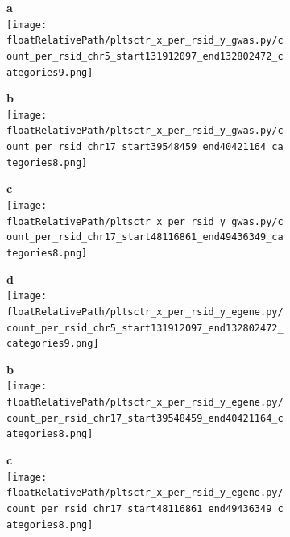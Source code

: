 \begin{figure}[!tbp]

\begin{subfigure}[]{.32\textwidth}
\textbf{a}
\\
\texttt{[image: \\floatRelativePath/pltsctr\_x\_per\_rsid\_y\_gwas.py/count\_per\_rsid\_chr5\_start131912097\_end132802472\_categories9.png]}
\end{subfigure}
%
\begin{subfigure}[]{.32\textwidth}
\textbf{b}
\\
\texttt{[image: \\floatRelativePath/pltsctr\_x\_per\_rsid\_y\_gwas.py/count\_per\_rsid\_chr17\_start39548459\_end40421164\_categories8.png]}
\end{subfigure}
%
\begin{subfigure}[]{.32\textwidth}
\textbf{c}
\\
\texttt{[image: \\floatRelativePath/pltsctr\_x\_per\_rsid\_y\_gwas.py/count\_per\_rsid\_chr17\_start48116861\_end49436349\_categories8.png]}
\end{subfigure}


\begin{subfigure}[]{.32\textwidth}
\textbf{d}
\\
\texttt{[image: \\floatRelativePath/pltsctr\_x\_per\_rsid\_y\_egene.py/count\_per\_rsid\_chr5\_start131912097\_end132802472\_categories9.png]}
\end{subfigure}
%
\begin{subfigure}[]{.32\textwidth}
\textbf{b}
\\
\texttt{[image: \\floatRelativePath/pltsctr\_x\_per\_rsid\_y\_egene.py/count\_per\_rsid\_chr17\_start39548459\_end40421164\_categories8.png]}
\end{subfigure}
%
\begin{subfigure}[]{.32\textwidth}
\textbf{c}
\\
\texttt{[image: \\floatRelativePath/pltsctr\_x\_per\_rsid\_y\_egene.py/count\_per\_rsid\_chr17\_start48116861\_end49436349\_categories8.png]}
\end{subfigure}


\end{figure}
